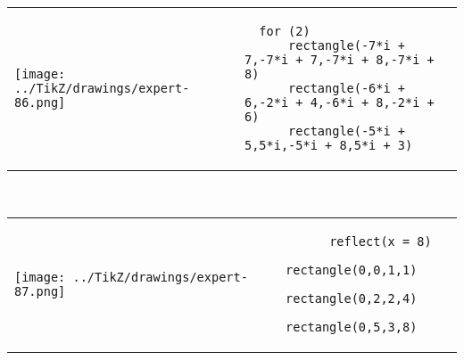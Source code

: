             \begin{tabular}{ll}
    \texttt{[image: ../TikZ/drawings/expert-86.png]}&
    
        \begin{minipage}{10cm}
        \begin{verbatim}
  for (2)
      rectangle(-7*i + 7,-7*i + 7,-7*i + 8,-7*i + 8)
      rectangle(-6*i + 6,-2*i + 4,-6*i + 8,-2*i + 6)
      rectangle(-5*i + 5,5*i,-5*i + 8,5*i + 3)
        \end{verbatim}
\end{minipage}

    \end{tabular}        
            \\

            \begin{tabular}{ll}
    \texttt{[image: ../TikZ/drawings/expert-87.png]}&
    
        \begin{minipage}{10cm}
        \begin{verbatim}
      reflect(x = 8)
      rectangle(0,0,1,1)
      rectangle(0,2,2,4)
      rectangle(0,5,3,8)
        \end{verbatim}
\end{minipage}

    \end{tabular}        
            